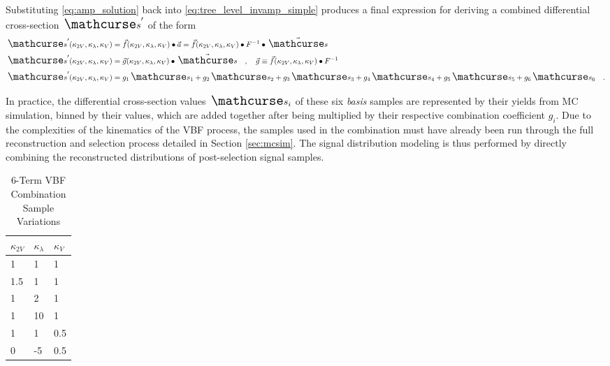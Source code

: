     \newcommand{\combterm}[1]{ g_{#1} \xsec_{#1} }

    Substituting \ref{eq:amp_solution} back into \ref{eq:tree_level_invamp_simple} produces
        a final expression for deriving a combined differential cross-section $\xsec'$ of the form
    \begin{equation} \label{eq:combination_general} \begin{split}
        \xsec'(\kvv,\kl,\kv) &= \vec{f}(\kvv,\kl,\kv) \bullet \vec{a}
            = \vec{f}(\kvv,\kl,\kv) \bullet F^{-1} \bullet \vec{\xsec} \\
        \xsec'(\kvv,\kl,\kv) &= \vec{g}(\kvv,\kl,\kv) \bullet \vec{\xsec}
            \quad,\quad \vec{g} \equiv \vec{f}(\kvv,\kl,\kv) \bullet F^{-1} \\
        \xsec'(\kvv,\kl,\kv) &= 
            \combterm{1} +
            \combterm{2} +
            \combterm{3} +
            \combterm{4} +
            \combterm{5} +
            \combterm{6}
        \quad.
    \end{split} \end{equation}

    In practice, the differential cross-section values $\xsec_i$ of these six \textit{basis} samples
        are represented by their yields from MC simulation,
        binned by their \mhh values,
        which are added together after being multiplied by their respective combination coefficient $g_i$.
    Due to the complexities of the kinematics of the VBF process,
        the samples used in the combination must have already been run through the full reconstruction and selection process detailed in Section \ref{sec:mcsim}.
    The signal distribution modeling is thus performed by directly combining the reconstructed \mhh distributions of post-selection signal samples.

    \begin{table}[] \centering
    \caption{6-Term VBF Combination Sample Variations}
    \label{tab:vbf_hh_6term_varlist}
    \begin{tabular}{ |l|l|l| }
        \hline
        \textbf {$\kappa_{2V}$} & \textbf {$\kappa_\lambda$} & \textbf {$\kappa_V$} \\
        \hline
            1   &   1 & 1   \\
            1.5 &   1 & 1   \\
            1   &   2 & 1   \\
            1   &  10 & 1   \\
            1   &   1 & 0.5 \\
            0   &  -5 & 0.5 \\
        \hline
    \end{tabular} \end{table}

